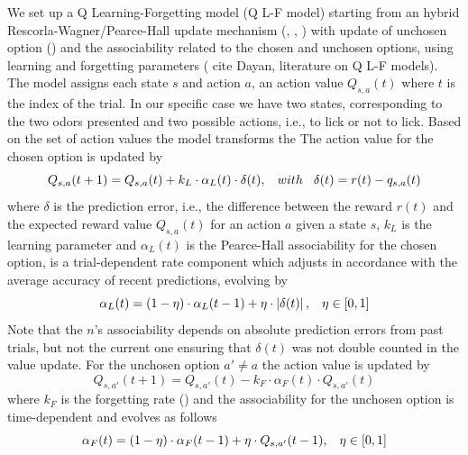 We set up a Q Learning-Forgetting model (Q L-F model) starting from an hybrid Rescorla-Wagner/Pearce-Hall update mechanism (\cite{Koppe}, \cite{Costa}, \cite{Li}) with update of unchosen option (\cite{Katahira}) and the associability related to the chosen and unchosen options, using learning and forgetting parameters ({\color{red} cite Dayan, literature on Q L-F models}).
The model assigns each state $s$ and action $a$, an action value $Q_{s,a}(t)$ where $t$ is the index of the trial. In our specific case we have two states, corresponding to the two odors presented and two possible actions, i.e., to lick or not to lick. 
Based on the set of action values the model transforms the The action value for the chosen option is updated by
\begin{equation}
Q_{s,a}(t+1)  = Q_{s,a}(t)+k_L\cdot\alpha_L(t)\cdot\delta(t), \hspace{0.3cm} with \hspace{0.3cm}\delta(t)=r(t)-q_{s,a}(t)
\label{eq:Qlearning}
\end{equation}
where $\delta$ is the prediction error, i.e., the difference between the reward $r(t)$ and the expected reward value $Q_{s,a}(t)$ for an action $a$ given a state $s$, $k_L$ is the learning parameter and $\alpha_L(t)$ is the Pearce-Hall associability for the chosen option, is a trial-dependent rate component which adjusts in accordance with the average accuracy of recent predictions, evolving by
\begin{equation}
   \alpha_L(t)=(1-\eta)\cdot\alpha_L(t-1)+\eta\cdot\left\lvert\delta(t)\right\rvert,\hspace{0.3cm} \eta\in[0,1]
    \label{eq:Alphalearning}
\end{equation}
Note that the $n$'s associability depends on absolute prediction errors from past trials, but not the current one ensuring that $\delta(t)$ was not double counted in the value update. 
For the unchosen option $a'\neq a$ the action value is updated by
\begin{equation}
    Q_{s,a'}(t+1) = Q_{s,a'}(t)-k_F\cdot\alpha_F(t)\cdot Q_{s,a'}(t)
    \label{eq:Qforgetting}
\end{equation}
where $k_F$ is the forgetting rate (\cite{ItoDoya}) and the associability for the unchosen option is time-dependent and evolves as follows
\begin{equation}
    \alpha_F(t)=(1-\eta)\cdot\alpha_F(t-1)+\eta\cdot Q_{s,a'}(t-1), \hspace{0.3cm}
    \eta\in[0,1]
    \label{eq:Alphaforgetting}
\end{equation}
